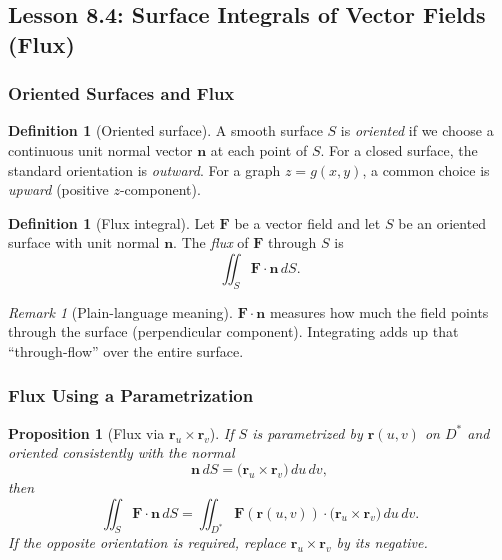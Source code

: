 \documentclass[12pt]{article}
\numberwithin{equation}{section}
\newcommand{\vect}[1]{\boldsymbol{#1}}   %
\theoremstyle{plain}
\newtheorem{proposition}[theorem]{Proposition}
\theoremstyle{definition}
\newtheorem{definition}[theorem]{Definition}
\theoremstyle{remark}
\newtheorem{remark}[theorem]{Remark}
\begin{document}
\subsection{Lesson 8.4: Surface Integrals of Vector Fields (Flux)}

\subsubsection{Oriented Surfaces and Flux}

\begin{definition}[Oriented surface]\label{def:oriented-surface}
A smooth surface $S$ is \emph{oriented} if we choose a continuous unit normal vector $\vect n$ at each point of $S$.  
For a closed surface, the standard orientation is \emph{outward}. For a graph $z=g(x,y)$, a common choice is \emph{upward} (positive $z$-component).
\end{definition}

\begin{definition}[Flux integral]\label{def:flux}
Let $\vect F$ be a vector field and let $S$ be an oriented surface with unit normal $\vect n$. The \emph{flux} of $\vect F$ through $S$ is
\begin{equation}\label{eq:flux}
\iint_S \vect F\cdot \vect n\,dS.
\end{equation}
\end{definition}

\begin{remark}[Plain-language meaning]
$\vect F\cdot \vect n$ measures how much the field points through the surface (perpendicular component). Integrating adds up that “through-flow” over the entire surface.
\end{remark}

\subsubsection{Flux Using a Parametrization}

\begin{proposition}[Flux via $\vect r_u\times \vect r_v$]\label{prop:flux-param}
If $S$ is parametrized by $\vect r(u,v)$ on $D^\ast$ and oriented consistently with the normal
\[
\vect n\,dS = \bigl(\vect r_u\times \vect r_v\bigr)\,du\,dv,
\]
then
\begin{equation}\label{eq:flux-param}
\iint_S \vect F\cdot \vect n\,dS
=
\iint_{D^\ast} \vect F(\vect r(u,v))\cdot\bigl(\vect r_u\times \vect r_v\bigr)\,du\,dv.
\end{equation}
If the opposite orientation is required, replace $\vect r_u\times \vect r_v$ by its negative.
\end{proposition}
\end{document}
